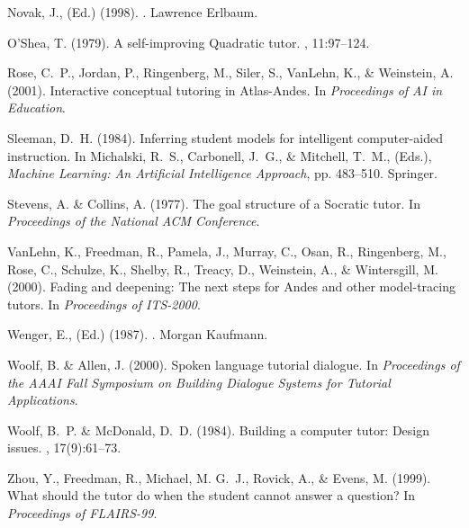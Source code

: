 \documentclass{llncs}
\begin{document}
\begin{thebibliography}{}
Novak, J., {\rm (Ed.)} (1998).
.
\newblock Lawrence Erlbaum.

O'Shea, T. (1979).
\newblock A self-improving {Q}uadratic tutor.
, 11:97--124.

Rose, C.~P., Jordan, P., Ringenberg, M., Siler, S., VanLehn, K., \&
  Weinstein, A. (2001).
\newblock Interactive conceptual tutoring in {A}tlas-{A}ndes.
\newblock In {\em Proceedings of AI in Education}.

Sleeman, D.~H. (1984).
\newblock Inferring student models for intelligent computer-aided instruction.
\newblock In Michalski, R.~S., Carbonell, J.~G., \& Mitchell, T.~M., {\rm
  (Eds.)}, {\em Machine Learning: An Artificial Intelligence Approach}, pp.
  483--510. Springer.

Stevens, A. \& Collins, A. (1977).
\newblock The goal structure of a {S}ocratic tutor.
\newblock In {\em Proceedings of the National ACM Conference}.

VanLehn, K., Freedman, R., Pamela, J., Murray, C., Osan, R., Ringenberg,
  M., Rose, C., Schulze, K., Shelby, R., Treacy, D., Weinstein, A., \&
  Wintersgill, M. (2000).
\newblock Fading and deepening: The next steps for {A}ndes and other
  model-tracing tutors.
\newblock In {\em Proceedings of ITS-2000}.

Wenger, E., {\rm (Ed.)} (1987).
.
\newblock Morgan Kaufmann.

Woolf, B. \& Allen, J. (2000).
\newblock Spoken language tutorial dialogue.
\newblock In {\em Proceedings of the AAAI Fall Symposium on Building Dialogue
  Systems for Tutorial Applications}.

Woolf, B.~P. \& McDonald, D.~D. (1984).
\newblock Building a computer tutor: Design issues.
, 17(9):61--73.

Zhou, Y., Freedman, R., Michael, M. G.~J., Rovick, A., \& Evens, M.
  (1999).
\newblock What should the tutor do when the student cannot answer a question?
\newblock In {\em Proceedings of FLAIRS-99}.

\end{thebibliography}
\end{document}
